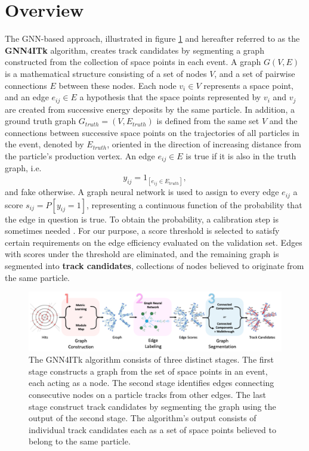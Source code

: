 \section{Overview}

The GNN-based approach, illustrated in figure \ref{fig:gnn4itk} and hereafter referred to as the \textbf{GNN4ITk} algorithm, creates track candidates by segmenting a graph constructed from the collection of space points in each event. 
A graph $G(V,E)$ is a mathematical structure consisting of a set of nodes $V$, and a set of pairwise connections $E$ between these nodes. 
Each node $v_i \in V$ represents a space point, and an edge $e_{ij} \in E$ a hypothesis that the space points represented by $v_i$ and $v_j$ are created from successive energy deposits by the same particle. 
In addition, a ground truth graph $G_{truth}= (V, E_{truth})$ is defined from the same set $V$ and the connections between successive space points on the trajectories of all particles in the event, denoted by $E_{truth}$, oriented in the direction of increasing distance from the particle's production vertex. 
An edge $e_{ij}\in E$ is true if it is also in the truth graph, i.e. 
\begin{equation}
\label{eq:9.1}
y_{ij} = 1_{[e_{ij} \in E_{truth}]},
\end{equation}
and fake otherwise. 
A graph neural network is used to assign to every edge $e_{ij} $ a score $s_{ij} = P[y_{ij} = 1]$, representing a continuous function of the probability that the edge in question is true.
To obtain the probability, a calibration step is sometimes needed \cite{Feng_2022}. 
For our purpose, a score threshold is selected to satisfy certain requirements on the edge efficiency evaluated on the validation set.
Edges with scores under the threshold are eliminated, and the remaining graph is segmented into \textbf{track candidates}, collections of nodes believed to originate from the same particle.

\begin{figure}[h!]
    \centering
    \includegraphics[width=\textwidth]{figures/gnn4itk.png}
    \caption{The GNN4ITk algorithm consists of three distinct stages. The first stage constructs a graph from the set of space points in an event, each acting as a node. The second stage identifies edges connecting consecutive nodes on a particle tracks from other edges. The last stage construct track candidates by segmenting the graph using the output of the second stage. The algorithm's output consists of individual track candidates each as a set of space points believed to belong to the same particle.}
    \label{fig:gnn4itk}
\end{figure}

